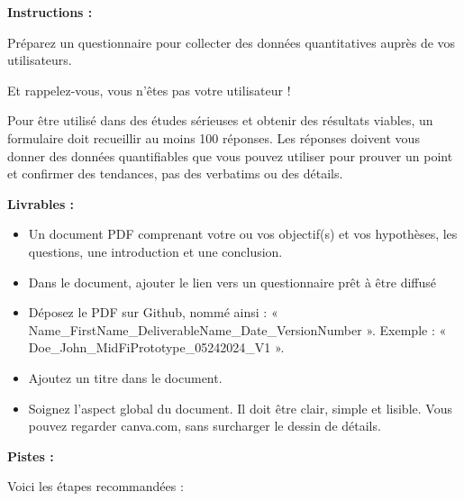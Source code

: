 \makeheaderfiles

\textbf{Instructions :}

Préparez un questionnaire pour collecter des données quantitatives auprès de vos utilisateurs.

Et rappelez-vous, vous n'êtes pas votre utilisateur !

Pour être utilisé dans des études sérieuses et obtenir des résultats viables, un formulaire doit recueillir au moins 100 réponses. Les réponses doivent vous donner des données quantifiables que vous pouvez utiliser pour prouver un point et confirmer des tendances, pas des verbatims ou des détails.

\textbf{Livrables :}

\begin{itemize}
\item Un document PDF comprenant votre ou vos objectif(s) et vos hypothèses, les questions, une introduction et une conclusion.
\item Dans le document, ajouter le lien vers un questionnaire prêt à être diffusé
\item Déposez le PDF sur Github, nommé ainsi : « Name\_FirstName\_DeliverableName\_Date\_VersionNumber ». Exemple : « Doe\_John\_MidFiPrototype\_05242024\_V1 ».
\item Ajoutez un titre dans le document.
\item Soignez l'aspect global du document. Il doit être clair, simple et lisible. Vous pouvez regarder canva.com, sans surcharger le dessin de détails.
\end{itemize}

\textbf{Pistes :}

Voici les étapes recommandées :

